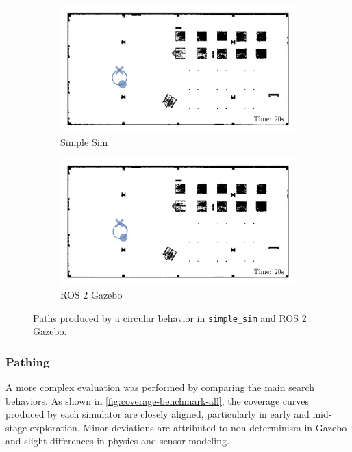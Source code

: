 \begin{figure}[H]
  \centering
  \begin{subfigure}[b]{0.45\textwidth}
    \centering
    \includegraphics[width=\textwidth]{./figures/plots/consistency/simple-sim-paths-(after-20s).png}
    \caption{Simple Sim}
  \end{subfigure}
  \begin{subfigure}[b]{0.45\textwidth}
    \centering
    \includegraphics[width=\textwidth]{./figures/plots/consistency/ros-2-paths-(after-20s).png}
    \caption{ROS 2 Gazebo}
  \end{subfigure}
  \caption{Paths produced by a circular behavior in \texttt{simple\_sim} and ROS 2 Gazebo.}
  \label{fig:movement-consistency}
\end{figure}

\subsubsection{Pathing}
A more complex evaluation was performed by comparing the main search behaviors. 
As shown in \cref{fig:coverage-benchmark-all}, the coverage curves produced by each simulator are closely aligned, particularly in early and mid-stage exploration. 
Minor deviations are attributed to non-determinism in Gazebo and slight differences in physics and sensor modeling.

